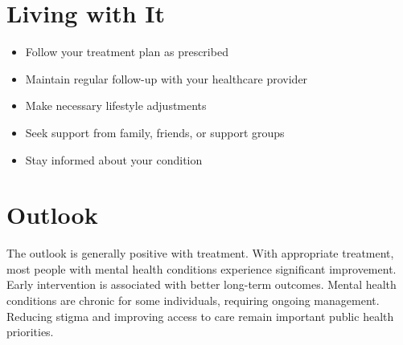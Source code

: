 \section{Living with It}
\begin{itemize}[noitemsep]
  \item Follow your treatment plan as prescribed
  \item Maintain regular follow-up with your healthcare provider
  \item Make necessary lifestyle adjustments
  \item Seek support from family, friends, or support groups
  \item Stay informed about your condition
\end{itemize}
\section{Outlook}
The outlook is generally positive with treatment. With appropriate treatment, most people with mental health conditions experience significant improvement. Early intervention is associated with better long-term outcomes. Mental health conditions are chronic for some individuals, requiring ongoing management. Reducing stigma and improving access to care remain important public health priorities.
